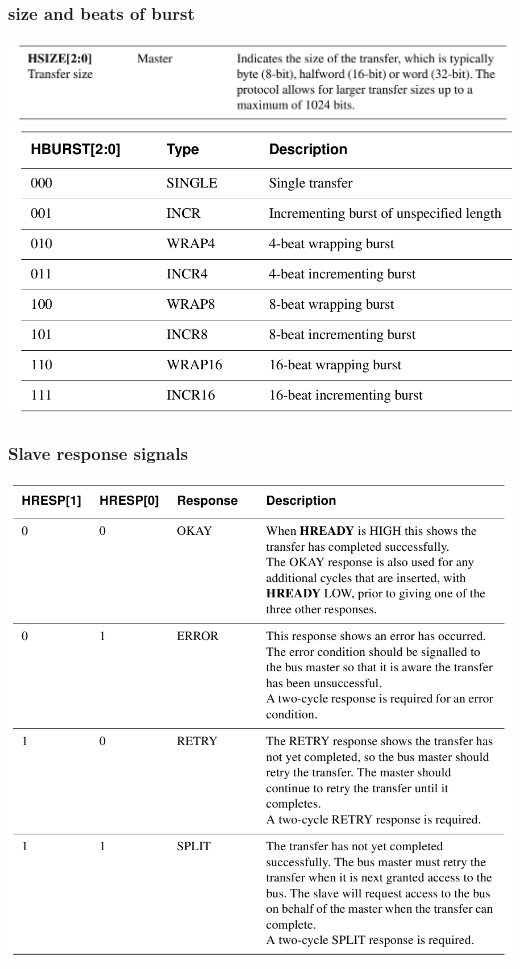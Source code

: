 \documentclass[a4paper]{scrartcl}
\begin{document}
        \subsubsection*{size and beats of burst}
        \centering\includegraphics[scale=0.4]{amba8.png}
        \centering\includegraphics[scale=0.4]{amba9.png}
        \subsubsection*{Slave response signals}
        \centering\includegraphics[scale=0.4]{amba10.png}
\end{document}
